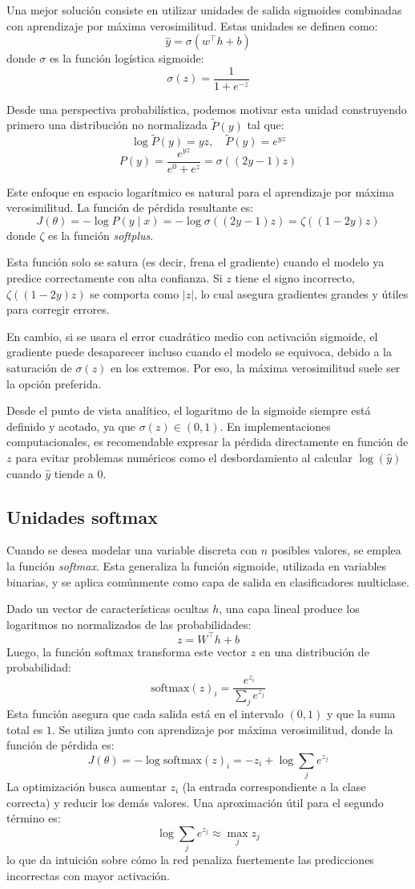 Una mejor solución consiste en utilizar unidades de salida sigmoides combinadas con aprendizaje por máxima verosimilitud. Estas unidades se definen como:
\[
\hat{y} = \sigma(w^\top h + b)
\]
donde $\sigma$ es la función logística sigmoide:
\[
\sigma(z) = \frac{1}{1 + e^{-z}}
\]

Desde una perspectiva probabilística, podemos motivar esta unidad construyendo primero una distribución no normalizada $\tilde{P}(y)$ tal que:
\[
\log \tilde{P}(y) = yz,\quad \tilde{P}(y) = e^{yz}
\]
\[
P(y) = \frac{e^{yz}}{e^{0} + e^{z}} = \sigma((2y - 1)z)
\]

Este enfoque en espacio logarítmico es natural para el aprendizaje por máxima verosimilitud. La función de pérdida resultante es:
\[
J(\theta) = -\log P(y \mid x) = -\log \sigma((2y - 1)z) = \zeta((1 - 2y)z)
\]
donde $\zeta$ es la función \textit{softplus}.

Esta función solo se satura (es decir, frena el gradiente) cuando el modelo ya predice correctamente con alta confianza. Si $z$ tiene el signo incorrecto, $\zeta((1 - 2y)z)$ se comporta como $|z|$, lo cual asegura gradientes grandes y útiles para corregir errores.

En cambio, si se usara el error cuadrático medio con activación sigmoide, el gradiente puede desaparecer incluso cuando el modelo se equivoca, debido a la saturación de $\sigma(z)$ en los extremos. Por eso, la máxima verosimilitud suele ser la opción preferida.

Desde el punto de vista analítico, el logaritmo de la sigmoide siempre está definido y acotado, ya que $\sigma(z) \in (0, 1)$. En implementaciones computacionales, es recomendable expresar la pérdida directamente en función de $z$ para evitar problemas numéricos como el desbordamiento al calcular $\log(\hat{y})$ cuando $\hat{y}$ tiende a $0$.

\subsection{Unidades softmax}
Cuando se desea modelar una variable discreta con $n$ posibles valores, se emplea la función \textit{softmax}. Esta generaliza la función sigmoide, utilizada en variables binarias, y se aplica comúnmente como capa de salida en clasificadores multiclase.

Dado un vector de características ocultas $h$, una capa lineal produce los logaritmos no normalizados de las probabilidades:
\[
z = W^\top h + b
\]
Luego, la función softmax transforma este vector $z$ en una distribución de probabilidad:
\[
\text{softmax}(z)_i = \frac{e^{z_i}}{\sum_j e^{z_j}}
\]
Esta función asegura que cada salida está en el intervalo $(0,1)$ y que la suma total es $1$. Se utiliza junto con aprendizaje por máxima verosimilitud, donde la función de pérdida es:
\[
J(\theta) = -\log \text{softmax}(z)_i = -z_i + \log \sum_j e^{z_j}
\]
La optimización busca aumentar $z_i$ (la entrada correspondiente a la clase correcta) y reducir los demás valores. Una aproximación útil para el segundo término es:
\[
\log \sum_j e^{z_j} \approx \max_j z_j
\]
lo que da intuición sobre cómo la red penaliza fuertemente las predicciones incorrectas con mayor activación.

